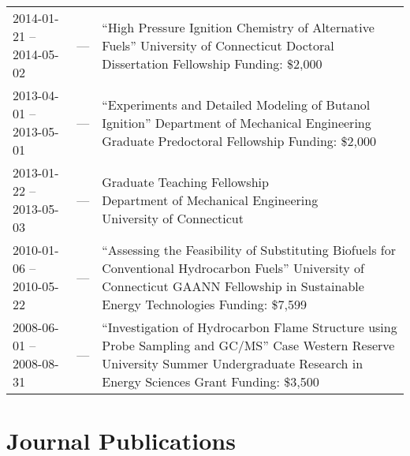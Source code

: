 \begin{center}
\begin{longtable}{lcl}
2014-01-21 -- 2014-05-02 & --- & \makecell{``High Pressure Ignition Chemistry of Alternative\\Fuels'' \\
University of Connecticut Doctoral Dissertation\\Fellowship \\
Funding: \$2,000} \\
2013-04-01 -- 2013-05-01 & --- & \makecell{``Experiments and Detailed Modeling of Butanol\\Ignition'' \\
Department of Mechanical Engineering Graduate\\Predoctoral Fellowship \\
Funding: \$2,000} \\
2013-01-22 -- 2013-05-03 & --- & \makecell{Graduate Teaching Fellowship \\
Department of Mechanical Engineering\\University of Connecticut} \\
2010-01-06 -- 2010-05-22 & --- & \makecell{``Assessing the Feasibility of Substituting Biofuels\\for Conventional Hydrocarbon Fuels'' \\
University of Connecticut GAANN Fellowship\\in Sustainable Energy Technologies \\
Funding: \$7,599} \\
2008-06-01 -- 2008-08-31 & --- & \makecell{``Investigation of Hydrocarbon Flame Structure\\using Probe Sampling and GC/MS'' \\
Case Western Reserve University Summer\\Undergraduate Research in Energy Sciences Grant \\
Funding: \$3,500}
\end{longtable}
\end{center}

\vspace{-3\baselineskip}

\section{{\sectionfont Journal Publications}}

